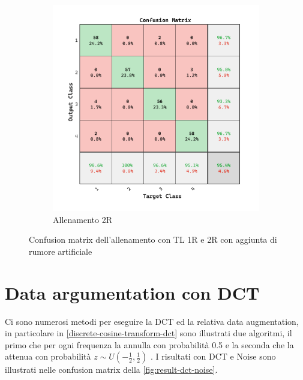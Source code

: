 \begin{figure}[H]
\begin{subfigure}{0.49\textwidth}
        \includegraphics[width=\textwidth]{addestramento-rete-neurale/two-noise.pdf}
        \caption{Allenamento 2R} 
    \end{subfigure}
    \caption{Confusion matrix dell'allenamento con TL 1R e 2R con aggiunta di rumore artificiale}
    \label{fig:result-noise}
\end{figure}

\section{Data argumentation con DCT}\label{data-argumentation-con-dct}

Ci sono numerosi metodi per eseguire la DCT ed la relativa data augmentation, in particolare in \cref{discrete-cosine-transform-dct} sono illustrati due algoritmi, il primo che per ogni frequenza la annulla con probabilità 0.5 e la seconda che la attenua con probabilità \(z\sim U\left(-\frac{1}{2}, \frac{1}{2}\right)\) \cite{nanni_dct_pca}. I risultati con DCT e Noise sono illustrati nelle confusion matrix della \cref{fig:result-dct-noise}.

